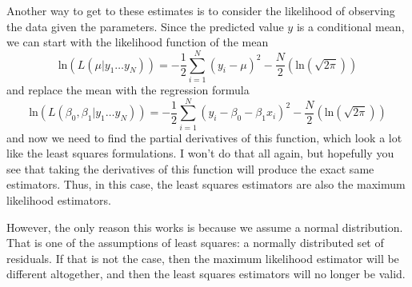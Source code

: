 Another way to get to these estimates is to consider the likelihood of observing the data given the parameters. Since the predicted value $y$ is a conditional mean, we can start with the likelihood function of the mean
\begin{equation}
\mbox{ln}\left(L\left(\mu\vert y_1\ldots y_N\right)\right)=-\frac{1}{2}\sum_{i=1}^N\left(y_i-\mu\right)^2-\frac{N}{2}\left(\mbox{ln}\left(\sqrt{2\pi}\right)\right)
\end{equation}
and replace the mean with the regression formula
\begin{equation}
\mbox{ln}\left(L\left(\beta_0,\beta_1 \vert y_1\ldots y_N\right)\right)=-\frac{1}{2}\sum_{i=1}^N\left(y_i-\beta_0-\beta_1x_i\right)^2-\frac{N}{2}\left(\mbox{ln}\left(\sqrt{2\pi}\right)\right)
\end{equation}
and now we need to find the partial derivatives of this function, which look a lot like the least squares formulations. I won't do that all again, but hopefully you see that taking the derivatives of this function will produce the exact same estimators.  Thus, in this case, the least squares estimators are also the maximum likelihood estimators.

However, the only reason this works is because we assume a normal distribution. That is one of the assumptions of least squares: a normally distributed set of residuals. If that is not the case, then the maximum likelihood estimator will be different altogether, and then the least squares estimators will no longer be valid.
